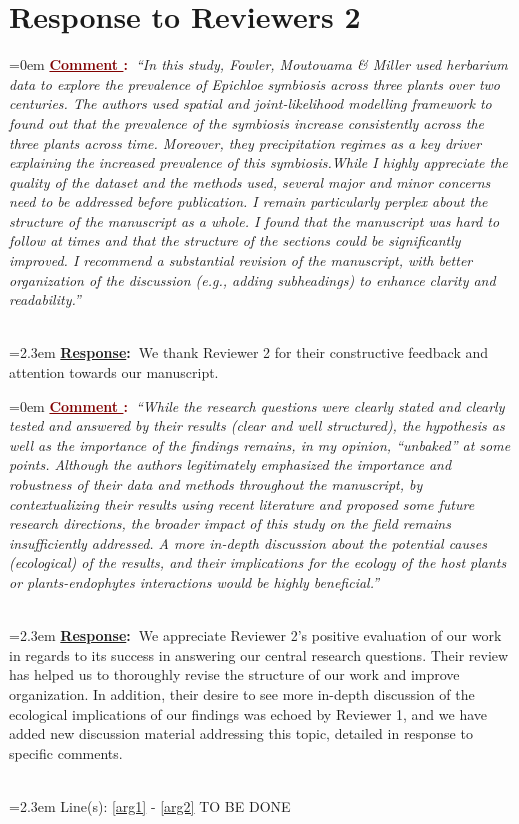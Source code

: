 \documentclass[12pt]{article}
\newcounter{cN}
\newcommand{\comment}[1]{
	\vspace{2em}
	\refstepcounter{cN} %
	\noindent \hangindent=0em \textbf{\textcolor{Maroon}{\uline{Comment \thecN}:~}}\emph{``#1''}
	}
\newcommand{\response}[1]{
	\\[0.25em]
	\hangindent=2.3em \textbf{\textcolor{NavyBlue}{\uline{Response}:~}}#1
	}
\newcommand{\linesref}[2]{
		\\[0.25em]
	\hangindent=2.3em {\color{Mahogany} Line(s): \ref{#1} - \ref{#2}}
}
\begin{document}
\section{Response to Reviewers 2}
\vspace{-2em}

\comment{In this study, Fowler, Moutouama \& Miller used herbarium data to explore the prevalence of Epichloe symbiosis across three plants over two centuries. The authors used spatial and joint-likelihood modelling framework to found out that the prevalence of the symbiosis increase consistently across the three plants across time. Moreover, they precipitation regimes as a key driver explaining the increased prevalence of this symbiosis.While I highly appreciate the quality of the dataset and the methods used, several major and minor concerns need to be addressed before publication. I remain particularly perplex about the structure of the manuscript as a whole. I found that the manuscript was hard to follow at times and that the structure of the sections could be significantly improved. I recommend a substantial revision of the manuscript, with better organization of the discussion (e.g., adding subheadings) to enhance clarity and readability.}
\response{We thank Reviewer 2 for their constructive feedback and attention towards our manuscript.}


\comment{While the research questions were clearly stated and clearly tested and answered by their results (clear and well structured), the hypothesis as well as the importance of the findings remains, in my opinion, “unbaked” at some points. Although the authors legitimately emphasized the importance and robustness of their data and methods throughout the manuscript, by contextualizing their results using recent literature and proposed some future research directions, the broader impact of this study on the field remains insufficiently addressed. A more in-depth discussion about the potential causes (ecological) of the results, and their implications for the ecology of the host plants or plants-endophytes interactions would be highly beneficial.}
\response{We appreciate Reviewer 2's positive evaluation of our work in regards to its success in answering our central research questions. Their review has helped us to thoroughly revise the structure of our work and improve organization. In addition, their desire to see more in-depth discussion of the ecological implications of our findings was echoed by Reviewer 1, and we have added new discussion material addressing this topic, detailed in response to specific comments.}
\linesref{arg1}{arg2} TO BE DONE
\end{document}
